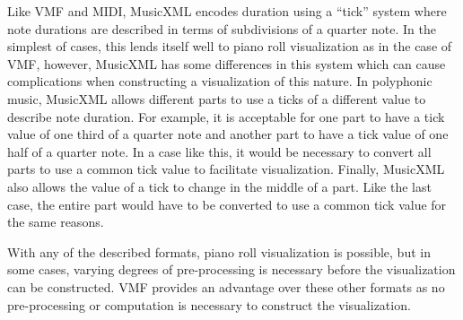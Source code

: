 Like VMF and MIDI, MusicXML encodes duration using a ``tick'' system where note durations are described in terms of subdivisions of a quarter note. In the simplest of cases, this lends itself well to piano roll visualization as in the case of VMF, however, MusicXML has some differences in this system which can cause complications when constructing a visualization of this nature. In polyphonic music, MusicXML allows different parts to use a ticks of a different value to describe note duration. For example, it is acceptable for one part to have a tick value of one third of a quarter note and another part to have a tick value of one half of a quarter note. In a case like this, it would be necessary to convert all parts to use a common tick value to facilitate visualization. Finally, MusicXML also allows the value of a tick to change in the middle of a part. Like the last case, the entire part would have to be converted to use a common tick value for the same reasons.

With any of the described formats, piano roll visualization is possible, but in some cases, varying degrees of pre-processing is necessary before the visualization can be constructed. VMF provides an advantage over these other formats as no pre-processing or computation is necessary to construct the visualization.